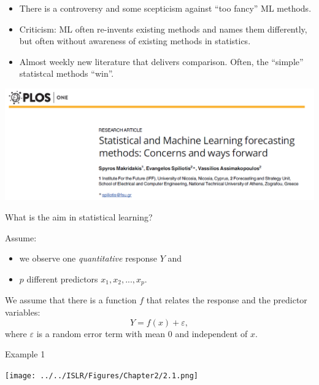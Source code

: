 \documentclass[ignorenonframetext,]{beamer}
\providecommand{\tightlist}{%
  \setlength{\itemsep}{0pt}\setlength{\parskip}{0pt}}
\begin{document}
\begin{frame}

\begin{itemize}
\item
  There is a controversy and some scepticism against ``too fancy'' ML
  methods.
\item
  Criticism: ML often re-invents existing methods and names them
  differently, but often without awareness of existing methods in
  statistics.
\item
  Almost weekly new literature that delivers comparison. Often, the
  ``simple'' statistcal methods ``win''.
\end{itemize}

\includegraphics{ML_vs_stat.png}

\end{frame}

\begin{frame}

\begin{block}{What is the aim in statistical learning?}

Assume:

\begin{itemize}
\tightlist
\item
  we observe one \emph{quantitative} response \(Y\) and
\item
  \(p\) different predictors \(x_1, x_2,... , x_p\).
\end{itemize}

We assume that there is a function \(f\) that relates the response and
the predictor variables: \[ Y = f(x) + \varepsilon,\] where
\(\varepsilon\) is a random error term with mean 0 and independent of
\(x\).

\end{block}

\end{frame}

\begin{frame}{Example 1}

\texttt{[image: ../../ISLR/Figures/Chapter2/2.1.png]}

\end{frame}
\end{document}
